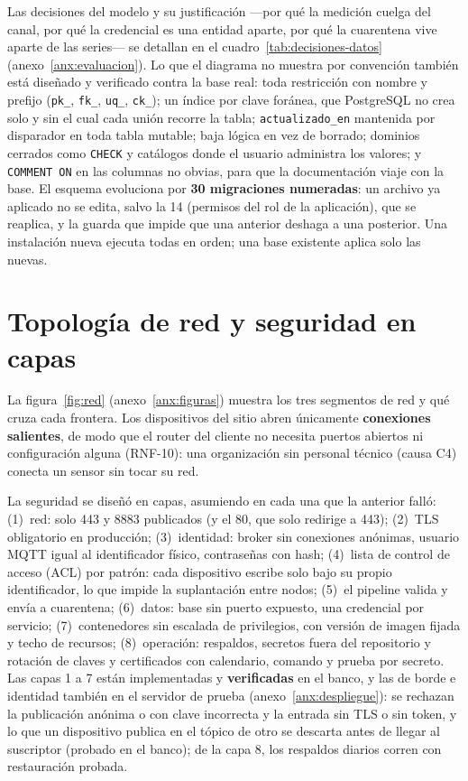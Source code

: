 Las decisiones del modelo y su justificación —por qué la medición cuelga del canal, por qué la credencial es una entidad aparte, por qué la cuarentena vive aparte de las series— se detallan en el cuadro~\ref{tab:decisiones-datos} (anexo~\ref{anx:evaluacion}). Lo que el diagrama no muestra por convención también está diseñado y verificado contra la base real: toda restricción con nombre y prefijo (\texttt{pk\_}, \texttt{fk\_}, \texttt{uq\_}, \texttt{ck\_}); un índice por clave foránea, que PostgreSQL no crea solo y sin el cual cada unión recorre la tabla; \texttt{actualizado\_en} mantenida por disparador en toda tabla mutable; baja lógica en vez de borrado; dominios cerrados como \texttt{CHECK} y catálogos donde el usuario administra los valores; y \texttt{COMMENT ON} en las columnas no obvias, para que la documentación viaje con la base. El esquema evoluciona por \textbf{30 migraciones numeradas}: un archivo ya aplicado no se edita, salvo la 14 (permisos del rol de la aplicación), que se reaplica, y la guarda que impide que una anterior deshaga a una posterior. Una instalación nueva ejecuta todas en orden; una
base existente aplica solo las nuevas.

\section{Topología de red y seguridad en capas}

La figura~\ref{fig:red} (anexo~\ref{anx:figuras}) muestra los tres segmentos de red y qué cruza cada frontera. Los dispositivos
del sitio abren únicamente \textbf{conexiones salientes}, de modo que el router del cliente no necesita
puertos abiertos ni configuración alguna (RNF-10): una organización sin personal técnico (causa C4)
conecta un sensor sin tocar su red.


La seguridad se diseñó en capas, asumiendo en cada una que la anterior falló: (1)~red: solo 443
y 8883 publicados (y el 80, que solo redirige a 443); (2)~TLS obligatorio en producción; (3)~identidad: broker sin conexiones anónimas,
usuario MQTT igual al identificador físico, contraseñas con hash; (4)~lista de control de acceso (ACL) por
patrón: cada dispositivo escribe solo bajo su propio identificador, lo que impide la suplantación entre
nodos; (5)~el pipeline valida y envía a cuarentena; (6)~datos: base sin puerto expuesto, una credencial
por servicio; (7)~contenedores sin escalada de privilegios, con versión de imagen fijada y techo de
recursos; (8)~operación: respaldos, secretos fuera del repositorio y rotación de claves y certificados con calendario, comando y prueba por secreto. Las capas 1 a 7 están implementadas y \textbf{verificadas} en el banco, y las de borde e identidad también en el servidor de prueba (anexo~\ref{anx:despliegue}): se rechazan la publicación anónima o con clave incorrecta y la entrada sin TLS o sin token, y lo que un dispositivo publica en el tópico de otro se descarta antes de llegar al suscriptor (probado en el banco); de la capa 8, los respaldos diarios corren con restauración probada.

